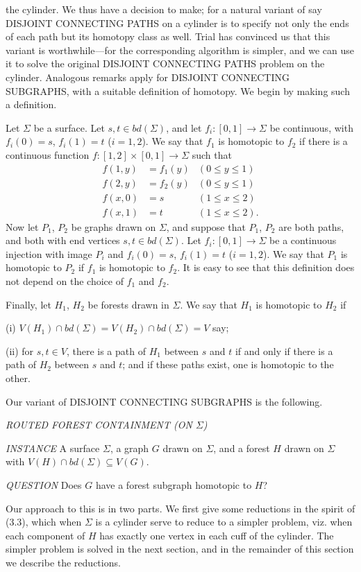 \noindent the cylinder. We thus have a decision to make; for a natural variant of say DISJOINT CONNECTING PATHS on a cylinder is to specify not only the ends of each path but its homotopy class as well. Trial has convinced us that this variant is worthwhile---for the corresponding algorithm is simpler, and we can use it to solve the original DISJOINT CONNECTING PATHS problem on the cylinder. Analogous remarks apply for DISJOINT CONNECTING SUBGRAPHS, with a suitable definition of homotopy. We begin by making such a definition.

Let $\Sigma$ be a surface. Let $s, t \in bd(\Sigma)$, and let $f_i \colon [0, 1] \to \Sigma$ be continuous, with $f_i(0) = s$, $f_i(1) = t$ ($i = 1, 2$). We say that $f_1$ is homotopic to $f_2$ if there is a continuous function $f \colon [1, 2] \times [0, 1] \to \Sigma$ such that
\begin{align*}
f(1, y) &= f_1(y) & (0 \le y \le 1) \\
f(2, y) &= f_2(y) & (0 \le y \le 1) \\
f(x, 0) &= s & (1 \le x \le 2) \\
f(x, 1) &= t & (1 \le x \le 2).
\end{align*}
Now let $P_1$, $P_2$ be graphs drawn on $\Sigma$, and suppose that $P_1$, $P_2$ are both paths, and both with end vertices $s, t \in bd(\Sigma)$. Let $f_i \colon [0, 1] \to \Sigma$ be a continuous injection with image $P_i$ and $f_i(0) = s$, $f_i(1) = t$ ($i = 1, 2$). We say that $P_1$ is homotopic to $P_2$ if $f_1$ is homotopic to $f_2$. It is easy to see that this definition does not depend on the choice of $f_1$ and $f_2$.

Finally, let $H_1$, $H_2$ be forests drawn in $\Sigma$. We say that $H_1$ is homotopic to $H_2$ if

\hspace*{12pt}(i) $V(H_1) \cap bd(\Sigma) = V(H_2) \cap bd(\Sigma) = V$ say;

\hspace*{12pt}(ii) for $s, t \in V$, there is a path of $H_1$ between $s$ and $t$ if and only if there is a path of $H_2$ between $s$ and $t$; and if these paths exist, one is homotopic to the other.

Our variant of DISJOINT CONNECTING SUBGRAPHS is the following.

\textit{ROUTED FOREST CONTAINMENT (ON $\Sigma$)}

\textit{INSTANCE} A surface $\Sigma$, a graph $G$ drawn on $\Sigma$, and a forest $H$ drawn on $\Sigma$ with $V(H) \cap bd(\Sigma) \subseteq V(G)$.

\textit{QUESTION} Does $G$ have a forest subgraph homotopic to $H$?

Our approach to this is in two parts. We first give some reductions in the spirit of (3.3), which when $\Sigma$ is a cylinder serve to reduce to a simpler problem, viz. when each component of $H$ has exactly one vertex in each cuff of the cylinder. The simpler problem is solved in the next section, and in the remainder of this section we describe the reductions.
